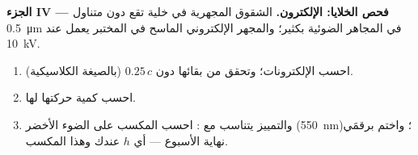 \begin{problem}
\medskip
\noindent\textbf{الجزء IV --- فحص الخلايا:  الإلكترون.}
الشقوق المجهرية في خلية تقع دون متناول \qty{0.5}{\micro m} في المجاهر
الضوئية بكثير؛ والمجهر الإلكتروني الماسح في المختبر يعمل عند \qty{10}{kV}.
\begin{enumerate}[resume]
  \item احسب  الإلكترونات؛ وتحقق من بقائها دون $0.25\,c$ (بالصيغة الكلاسيكية).
  \item احسب كمية حركتها  لها.
  \item والتمييز يتناسب مع : احسب المكسب على الضوء الأخضر
        (\qty{550}{nm})؛ واختم برقمَي نهاية الأسبوع --- أي $h$ عندك
        وهذا المكسب.
\end{enumerate}
\end{problem}
